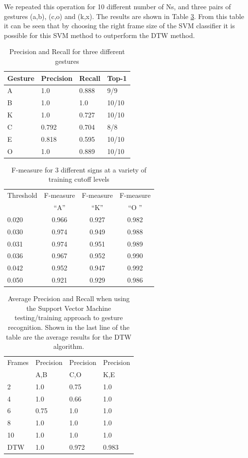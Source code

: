 \documentclass[twoside,10pt,a4paper]{article}
\begin{document}
We repeated this operation for 10 different number of Ns, and three
pairs of gestures (a,b), (c,o) and (k,x).  The results are shown in
Table \ref{table:svm}.  From this table it can be seen that by
choosing the right frame size of the SVM classifier it is possible for
this SVM method to outperform the DTW method.

\begin{table} 
\begin{tabular}{|l|l|l|l|}
\hline
 Gesture   &  Precision  &  Recall & Top-1  \\
\hline
A & 1.0 & 0.888 & 9/9 \\
B & 1.0 & 1.0 & 10/10 \\
K & 1.0 & 0.727 & 10/10 \\
C & 0.792 & 0.704 & 8/8 \\ 
E & 0.818 & 0.595 & 10/10 \\
O & 1.0   & 0.889 & 10/10 \\
\hline
\end{tabular}
\caption{Precision and Recall for three different gestures}
\label{table:precisionrecall}
\end{table}

\begin{table} 
\begin{tabular}{|l|c|c|c|}
\hline
Threshold & F-measure & F-measure & F-measure \\
          &   ``A'' &  ``K'' &  ``O '' \\
\hline
0.020 & 0.966 & 0.927 & 0.982 \\
0.030 & 0.974 & 0.949 & 0.988 \\
0.031 & 0.974 & 0.951 & 0.989 \\
0.036 & 0.967 & 0.952 & 0.990 \\
0.042 & 0.952 & 0.947 & 0.992 \\
0.050 & 0.921 & 0.929 & 0.986 \\
\hline
\end{tabular}
\caption{F-measure for 3 different signs at a variety of training cutoff levels}
\label{table:fmeasuretraining}
\end{table}

\begin{table} 
\begin{tabular}{|l|l|l|l|}
\hline
Frames & Precision & Precision & Precision \\
       & A,B & C,O & K,E \\
\hline
2    & 1.0    & 0.75    & 1.0     \\
4    & 1.0    & 0.66    & 1.0     \\
6    & 0.75   & 1.0     & 1.0     \\
8    & 1.0    & 1.0     & 1.0     \\
10   & 1.0    & 1.0     & 1.0     \\
DTW  & 1.0    & 0.972   & 0.983   \\
\hline
\end{tabular}
\caption{Average Precision and Recall when using the Support Vector
  Machine testing/training approach to gesture recognition.  Shown in
  the last line of the table are the average results for the DTW
  algorithm.}
\label{table:svm}
\end{table}
\end{document}
